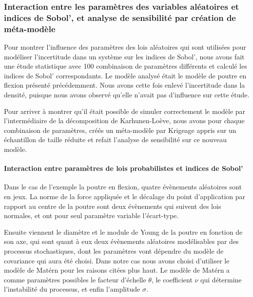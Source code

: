 \documentclass[a4paper,10pt]{article}
\begin{document}
\subsubsection{Interaction entre les paramètres des variables aléatoires et indices de Sobol', et analyse de sensibilité par création de méta-modèle}
Pour montrer l'influence des paramètres des lois aléatoires qui sont utilisées pour modéliser l'incertitude dans un système sur les indices de Sobol', nous avons fait une étude statistique avec 100 combinaison de paramètres différents et calculé les indices de Sobol' correspondants. Le modèle analysé était le modèle de poutre en flexion présenté précédemment. Nous avons cette fois enlevé l'incertitude dans la densité, puisque nous avons observé qu'elle n'avait pas d'influence sur cette étude. \par \smallskip
Pour arriver à montrer qu'il était possible de simuler correctement le modèle par l'intermédiaire de la décomposition de Karhunen-Loève, nous avons pour chaque combinaison de paramètres, créés un méta-modèle par Krigeage appris sur un échantillon de taille réduite et refait l'analyse de sensibilité sur ce nouveau modèle. \par \bigskip

\paragraph{Interaction entre paramètres de lois probabilistes et indices de Sobol'}
Dans le cas de l'exemple la poutre en flexion, quatre évènements aléatoires sont en jeux. La norme de la force appliquée et le décalage du point d'application par rapport au centre de la poutre sont deux évènements qui suivent des lois normales, et ont pour seul paramètre variable l'écart-type. \par \smallskip

Ensuite viennent le diamètre et le module de Young de la poutre en fonction de son axe, qui sont quant à eux deux évènements aléatoires modélisables par des processus stochastiques, dont les paramètres vont dépendre du modèle de covariance qui aura été choisi. Dans notre cas nous avons choisi d'utiliser le modèle de Matérn pour les raisons citées plus haut. Le modèle de Matérn a comme paramètres possibles le facteur d'échelle $\theta$, le coefficient $\nu$ qui détermine l'instabilité du processus, et enfin l'amplitude $\sigma$. \par \smallskip 
\end{document}
